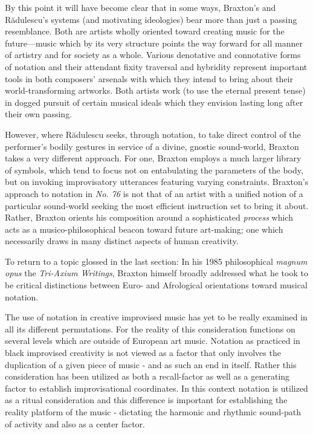     By this point it will have become clear that in some ways, Braxton's and R\u{a}dulescu's systems (and motivating ideologies) bear more than just a passing resemblance. Both are artists wholly oriented toward creating music for the future---music which by its very structure points the way forward for all manner of artistry and for society as a whole. Various denotative and connotative forms of notation and their attendant fixity traversal and hybridity represent important tools in both composers' arsenals with which they intend to bring about their world-transforming artworks. Both artists work (to use the eternal present tense) in dogged pursuit of certain musical ideals which they envision lasting long after their own passing.

    However, where R\u{a}dulescu seeks, through notation, to take direct control of the performer's bodily gestures in service of a divine, gnostic sound-world, Braxton takes a very different approach. For one, Braxton employs a much larger library of symbols, which tend to focus not on entabulating the parameters of the body, but on invoking improvisatory utterances featuring varying constraints. Braxton's approach to notation in \textit{No. 76} is not that of an artist with a unified notion of a particular sound-world seeking the most efficient instruction set to bring it about. Rather, Braxton orients his composition around a sophisticated \textit{process} which acts as a musico-philosophical beacon toward future art-making; one which necessarily draws in many distinct aspects of human creativity.
    
    To return to a topic glossed in the last section: In his 1985 philosophical \textit{magnum opus} the \textit{Tri-Axium Writings}, Braxton himself broadly addressed what he took to be critical distinctions between Euro- and Afrological orientations toward musical notation.
    
    \begin{smallquote}
        The use of notation in creative improvised music has yet to be really examined in all its different permutations. For the reality of this consideration functions on several levels which are outside of European art music. Notation as practiced in black improvised creativity is not viewed as a factor that only involves the duplication of a given piece of music - and as such an end in itself. Rather this consideration has been utilized as both a recall-factor as well as a generating factor to establish improvisational coordinates. In this context notation is utilized as a ritual consideration and this difference is important for establishing the reality platform of the music - dictating the harmonic and rhythmic sound-path of activity and also as a center factor.\autocite[35]{Braxton_1985}
    \end{smallquote}

